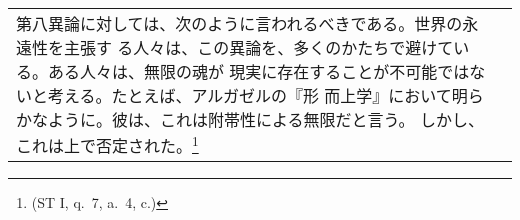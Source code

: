 \documentclass[10pt]{jsarticle} %
\begin{document}
\begin{longtable}{p{21em}p{21em}}
第八異論に対しては、次のように言われるべきである。世界の永遠性を主張す
る人々は、この異論を、多くのかたちで避けている。ある人々は、無限の魂が
現実に存在することが不可能ではないと考える。たとえば、アルガゼルの『形
而上学』において明らかなように。彼は、これは附帯性による無限だと言う。
しかし、これは上で否定された。\footnote{(ST I, q.~7, a.~4, c.)}

\end{longtable}
\end{document}
